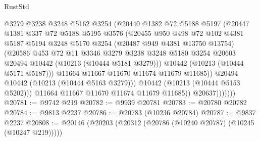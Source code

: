 \begin{lexlean}{RustStd}
\begin{coremodule}
{\begin{coremodule}
{{{{{{{{{{{{{{{{{{{{{{{{{{                          @3279
                          @3238
                          @3248
                          @5162
                          @3254
                          (@20440
                            @1382
                            @72
                            @5188
                            @5197
                            (@20447
                              @1381
                              @337
                              @72
                              @5188
                              @5195
                              @3576
                              (@20455
                                @950
                                @498
                                @72
                                @102
                                @4381
                                @5187
                                @5194
                                @3248
                                @5170
                                @3254
                                (@20487 @949 @4381 @13750 @13754)
                                (@20586
                                  @453
                                  @72
                                  @11
                                  @3346
                                  @3279
                                  @3238
                                  @3248
                                  @5180
                                  @3254
                                  @20603
                                  @20494
                                  @10442
                                  (@10213 (@10444 @5181 @3279)))
                                @10442
                                (@10213 (@10444 @5171 @5187)))
                              @11664
                              @11667
                              @11670
                              @11674
                              @11679
                              @11685))
                          @20494
                          @10442
                          (@10213 (@10444 @5163 @3279)))
                        @10442
                        (@10213 (@10444 @5153 @5202)))
                      @11664
                      @11667
                      @11670
                      @11674
                      @11679
                      @11685))
                  @20637)))))))
@20781 := @9742 @219
@20782 := @9939 @20781
@20783 := @20780 @20782
@20784 := @9813 @2237
@20786 := @20783 (@10236 @20784)
@20787 := @9837 @2237
@20808 := @20146
    (@20203 (@20312 (@20786 (@10240 @20787) (@10245 (@10247 @219)))))
}}}}}}}}}}}}}}}}}}}}}}}}}}
\end{coremodule}}
\end{coremodule}
\end{lexlean}

